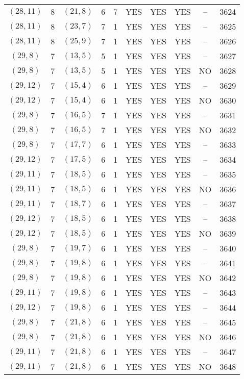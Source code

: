 \begin{longtable}{|c|c|c|c|c|c|c|c|c|c|}
$(28, 11)$ & 8 & $(21, 8)$ & 6 & 7 & YES & YES & YES & -- & 3624\\
$(28, 11)$ & 8 & $(23, 7)$ & 7 & 1 & YES & YES & YES & -- & 3625\\
$(28, 11)$ & 8 & $(25, 9)$ & 7 & 1 & YES & YES & YES & -- & 3626\\
$(29, 8)$ & 7 & $(13, 5)$ & 5 & 1 & YES & YES & YES & -- & 3627\\
$(29, 8)$ & 7 & $(13, 5)$ & 5 & 1 & YES & YES & YES & NO & 3628\\
$(29, 12)$ & 7 & $(15, 4)$ & 6 & 1 & YES & YES & YES & -- & 3629\\
$(29, 12)$ & 7 & $(15, 4)$ & 6 & 1 & YES & YES & YES & NO & 3630\\
$(29, 8)$ & 7 & $(16, 5)$ & 7 & 1 & YES & YES & YES & -- & 3631\\
$(29, 8)$ & 7 & $(16, 5)$ & 7 & 1 & YES & YES & YES & NO & 3632\\
$(29, 8)$ & 7 & $(17, 7)$ & 6 & 1 & YES & YES & YES & -- & 3633\\
$(29, 12)$ & 7 & $(17, 5)$ & 6 & 1 & YES & YES & YES & -- & 3634\\
$(29, 11)$ & 7 & $(18, 5)$ & 6 & 1 & YES & YES & YES & -- & 3635\\
$(29, 11)$ & 7 & $(18, 5)$ & 6 & 1 & YES & YES & YES & NO & 3636\\
$(29, 11)$ & 7 & $(18, 7)$ & 6 & 1 & YES & YES & YES & -- & 3637\\
$(29, 12)$ & 7 & $(18, 5)$ & 6 & 1 & YES & YES & YES & -- & 3638\\
$(29, 12)$ & 7 & $(18, 5)$ & 6 & 1 & YES & YES & YES & NO & 3639\\
$(29, 8)$ & 7 & $(19, 7)$ & 6 & 1 & YES & YES & YES & -- & 3640\\
$(29, 8)$ & 7 & $(19, 8)$ & 6 & 1 & YES & YES & YES & -- & 3641\\
$(29, 8)$ & 7 & $(19, 8)$ & 6 & 1 & YES & YES & YES & NO & 3642\\
$(29, 11)$ & 7 & $(19, 8)$ & 6 & 1 & YES & YES & YES & -- & 3643\\
$(29, 12)$ & 7 & $(19, 8)$ & 6 & 1 & YES & YES & YES & -- & 3644\\
$(29, 8)$ & 7 & $(21, 8)$ & 6 & 1 & YES & YES & YES & -- & 3645\\
$(29, 8)$ & 7 & $(21, 8)$ & 6 & 1 & YES & YES & YES & NO & 3646\\
$(29, 11)$ & 7 & $(21, 8)$ & 6 & 1 & YES & YES & YES & -- & 3647\\
$(29, 11)$ & 7 & $(21, 8)$ & 6 & 1 & YES & YES & YES & NO & 3648\\

\end{longtable}
